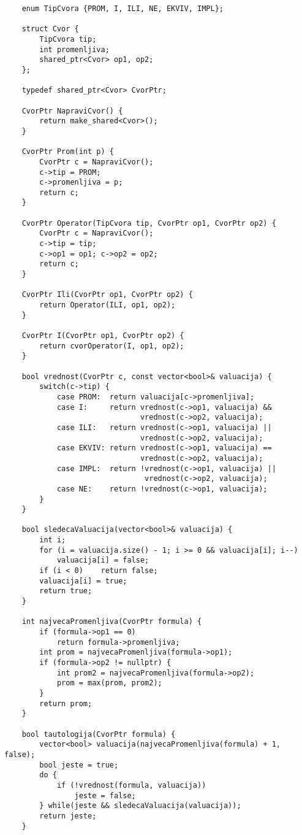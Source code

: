 \documentclass{article}
\begin{document}
\begin{lstlisting}
    enum TipCvora {PROM, I, ILI, NE, EKVIV, IMPL};
    
    struct Cvor {
        TipCvora tip;
        int promenljiva;
        shared_ptr<Cvor> op1, op2;
    };

    typedef shared_ptr<Cvor> CvorPtr;

    CvorPtr NapraviCvor() {
        return make_shared<Cvor>();
    }

    CvorPtr Prom(int p) {
        CvorPtr c = NapraviCvor();
        c->tip = PROM;
        c->promenljiva = p;
        return c;
    }

    CvorPtr Operator(TipCvora tip, CvorPtr op1, CvorPtr op2) {
        CvorPtr c = NapraviCvor();
        c->tip = tip;
        c->op1 = op1; c->op2 = op2;
        return c;
    }
    
    CvorPtr Ili(CvorPtr op1, CvorPtr op2) {
        return Operator(ILI, op1, op2);
    }

    CvorPtr I(CvorPtr op1, CvorPtr op2) {
        return cvorOperator(I, op1, op2);
    }
    
    bool vrednost(CvorPtr c, const vector<bool>& valuacija) {
        switch(c->tip) {
            case PROM:  return valuacija[c->promenljiva];
            case I:     return vrednost(c->op1, valuacija) &&         
                               vrednost(c->op2, valuacija);
            case ILI:   return vrednost(c->op1, valuacija) || 
                               vrednost(c->op2, valuacija);
            case EKVIV: return vrednost(c->op1, valuacija) ==     
                               vrednost(c->op2, valuacija);
            case IMPL:  return !vrednost(c->op1, valuacija) || 
                                vrednost(c->op2, valuacija);
            case NE:    return !vrednost(c->op1, valuacija);
        }
    }
    
    bool sledecaValuacija(vector<bool>& valuacija) {
        int i;
        for (i = valuacija.size() - 1; i >= 0 && valuacija[i]; i--)
            valuacija[i] = false;
        if (i < 0)    return false;
        valuacija[i] = true;
        return true;
    }
    
    int najvecaPromenljiva(CvorPtr formula) {
        if (formula->op1 == 0)
            return formula->promenljiva;
        int prom = najvecaPromenljiva(formula->op1);
        if (formula->op2 != nullptr) {
            int prom2 = najvecaPromenljiva(formula->op2);
            prom = max(prom, prom2);
        }
        return prom;
    }
    
    bool tautologija(CvorPtr formula) {
        vector<bool> valuacija(najvecaPromenljiva(formula) + 1, false);
        bool jeste = true;
        do {
            if (!vrednost(formula, valuacija))
                jeste = false;
        } while(jeste && sledecaValuacija(valuacija));
        return jeste;
    }
\end{lstlisting}
\end{document}
